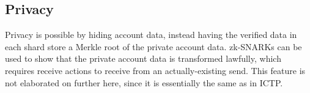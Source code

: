 \documentclass{article}
\begin{document}
  \subsection{Privacy}


  Privacy is possible by hiding account data, instead having the verified data in each shard store a Merkle root of the private account data.  zk-SNARKs can be used to show that the private account data is transformed lawfully, which requires receive actions to receive from an actually-existing send.  This feature is not elaborated on further here, since it is essentially the same as in ICTP.
\end{document}
